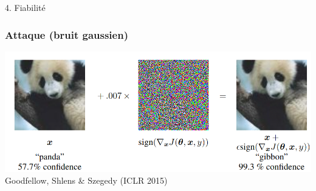 \documentclass[sans,14pt]{beamer}
\begin{document}
{%



\begin{frame}
  \begin{center}
    \Large 4. Fiabilité
  \end{center}
\end{frame}

\begin{frame}
  \frametitle{Attaque (bruit gaussien)}
  \begin{center}
    \includegraphics[width=\textwidth]{figures/adversarial_goodfellow_2015.png} \\
    {\footnotesize Goodfellow, Shlens \& Szegedy (ICLR 2015)}
  \end{center}
\end{frame}

}
\end{document}
